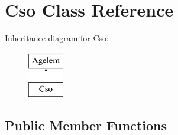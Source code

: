 \hypertarget{class_cso}{}\section{Cso Class Reference}
\label{class_cso}
Inheritance diagram for Cso\+:\begin{figure}[H]
\begin{center}
\leavevmode
\includegraphics[height=2.000000cm]{class_cso}
\end{center}
\end{figure}
\subsection*{Public Member Functions}
